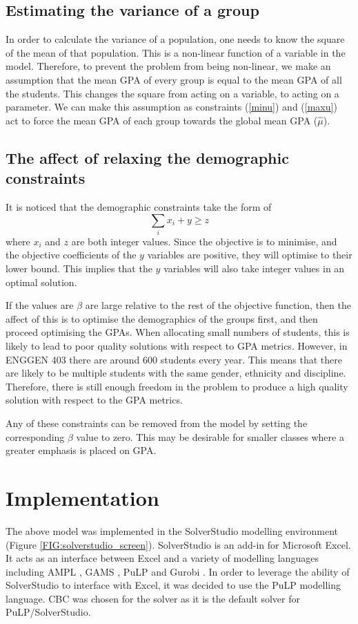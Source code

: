 \documentclass[12pt]{ORSNZ}
\begin{document}
\subsection{Estimating the variance of a group}
In order to calculate the variance of a population, one needs to know the square of the mean of that population. This is a non-linear function of a variable in the model. Therefore, to prevent the problem from being non-linear, we make an assumption that the mean GPA of every group is equal to the mean GPA of all the students. This changes the square from acting on a variable, to acting on a parameter. We can make this assumption as constraints (\ref{minu}) and (\ref{maxu}) act to force the mean GPA of each group towards the global mean GPA ($\hat{\mu}$).

\subsection{The affect of relaxing the demographic constraints}
It is noticed that the demographic constraints take the form of 
\begin{equation}
\sum_i x_i + y \geq z
\end{equation}
where $x_i$ and $z$ are both integer values. Since the objective is to minimise, and the objective coefficients of the $y$ variables are positive, they will optimise to their lower bound. This implies that the $y$ variables will also take integer values in an optimal solution. 

If the values are $\beta$ are large relative to the rest of the objective function, then the affect of this is to optimise the demographics of the groups first, and then proceed optimising the GPAs. When allocating small numbers of students, this is likely to lead to poor quality solutions with respect to GPA metrics. However, in ENGGEN 403 there are around 600 students every year. This means that there are likely to be multiple students with the same gender, ethnicity and discipline. Therefore, there is still enough freedom in the problem to produce a high quality solution with respect to the GPA metrics.

Any of these constraints can be removed from the model by setting the corresponding $\beta$ value to zero. This may be desirable for smaller classes where a greater emphasis is placed on GPA.

\section{Implementation}
The above model was implemented in the SolverStudio \cite{solverstudio} modelling environment (Figure \ref{FIG:solverstudio_screen}). SolverStudio is an add-in for Microsoft Excel. It acts as an interface between Excel and a variety of modelling languages including AMPL \cite{ampl}, GAMS \cite{gams}, PuLP \cite{pulp} and Gurobi \cite{gurobi}. In order to leverage the ability of SolverStudio to interface with Excel, it was decided to use the PuLP modelling language. CBC \cite{CBC} was chosen for the solver as it is the default solver for PuLP/SolverStudio.
\end{document}
